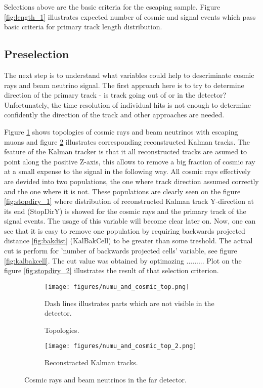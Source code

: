 Selections above are the basic criteria for the escaping sample. Figure \ref{fig:length_1} illustrates 
expected number of cosmic and signal events which pass basic criteria for primary track length distribution.

\subsection{Preselection} \label{presel}
The next step is to understand what variables could help to descriminate cosmic rays and beam neutrino
signal. The first approach here is to try to determine direction of the primary track - is track going 
out of or in the detector? Unfortunately, the time resolution of individual hits is not enough to determine 
confidently the direction of the track and other approaches are needed. 

Figure \ref{fig:cosmic_top} shows topologies of cosmic rays and beam neutrinos with escaping muons and figure
\ref{fig:cosmic_top_2} illustrates corresponding reconstructed Kalman tracks. The feature of the Kalman 
tracker is that it all reconstructed tracks are asumed to point along the positive Z-axis, this allows 
to remove a big fraction of cosmic ray at a small expense to the signal in the following way. All cosmic 
rays effectively are devided into two populations, the one where track direction assumed correctly and the 
one where it is not. These populations are clearly seen on the figure \ref{fig:stopdiry_1} where distribution
of reconstructed Kalman track Y-direction at its end (StopDirY) is showed for the cosmic rays and the primary 
track of the signal events. The usage of this variable will become clear later on. Now, one can see that it 
is easy to remove one population by requiring backwards projected distance \ref{fig:bakdist} (KalBakCell) to 
be greater than some treshold. The actual cut is perform for 'number of backwards projected cells' variable, 
see figure \ref{fig:kalbakcell}. The cut value was obtained by optimazing .........
Plot on the figure \ref{fig:stopdiry_2} illustrates the result of that selection criterion.
\begin{figure}[h]
\begin{subfigure}[t]{0.9\textwidth}
  \centering
  \texttt{[image: figures/numu\_and\_cosmic\_top.png]}
  \caption{Topologies.}
  {Dash lines illustrates parts which are not visible in the detector.}
  \label{fig:cosmic_top}
\end{subfigure}
\vspace{0.5cm}
\newline
\begin{subfigure}[t]{0.9\textwidth}
  \centering
  \texttt{[image: figures/numu\_and\_cosmic\_top\_2.png]}
  \caption{Reconstracted Kalman tracks.}
  \label{fig:cosmic_top_2}
\end{subfigure}
\caption{Cosmic rays and beam neutrinos in the far detector.}
\label{fig:top_and_reco_tracks}
\end{figure}

